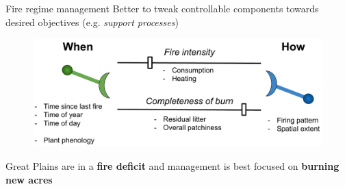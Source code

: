 \documentclass[11pt]{beamer}
\begin{document}
\begin{frame}{Fire regime management}
	Better to tweak controllable components towards desired objectives (e.g. \emph{support processes})
	\begin{center}
		\begin{figure}
			\includegraphics[width=1\linewidth]{figs/levers} 
		\end{figure}
	\end{center}
\alert{Great Plains are in a \textbf{fire deficit} and management is best focused on \textbf{burning new acres}}
\end{frame}
\end{document}

